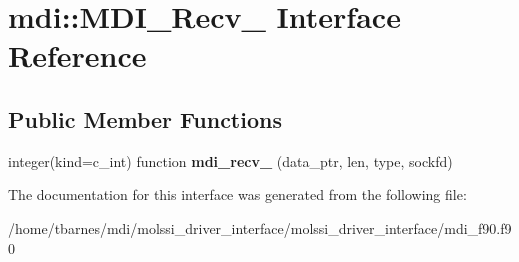 \hypertarget{interfacemdi_1_1MDI__Recv__}{\section{mdi\-:\-:M\-D\-I\-\_\-\-Recv\-\_\- Interface Reference}
\label{interfacemdi_1_1MDI__Recv__}
}
\subsection*{Public Member Functions}
\begin{DoxyCompactItemize}
\item 
\hypertarget{interfacemdi_1_1MDI__Recv___a8fedb55dee72ce92d39dbd64996772dc}{integer(kind=c\-\_\-int) function {\bfseries mdi\-\_\-recv\-\_\-} (data\-\_\-ptr, len, type, sockfd)}\label{interfacemdi_1_1MDI__Recv___a8fedb55dee72ce92d39dbd64996772dc}

\end{DoxyCompactItemize}


The documentation for this interface was generated from the following file\-:\begin{DoxyCompactItemize}
\item 
/home/tbarnes/mdi/molssi\-\_\-driver\-\_\-interface/molssi\-\_\-driver\-\_\-interface/mdi\-\_\-f90.\-f90\end{DoxyCompactItemize}
